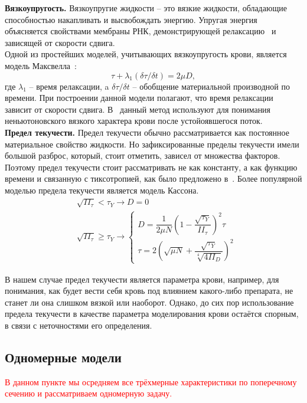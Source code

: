 \textbf{Вязкоупругость.}
Вязкоупругие жидкости -- это вязкие жидкости, обладающие способностью накапливать и высвобождать энергию. 
Упругая энергия объясняется свойствами мембраны РНК, демонстрирующей релаксацию~\cite{evans:1976} и зависящей от скорости сдвига.\\
Одной из простейших моделей, учитывающих вязкоупругость крови, является модель Максвелла~\cite{thurston:1972}:
$$
\tau+\lambda_1(\delta\tau / \delta t)=2\mu D,
$$  
где $\lambda_1$ -- время релаксации, a $\delta\tau / \delta t$ -- обобщение материальной производной по времени.
При построении данной модели полагают, что время релаксации зависит от скорости сдвига.
В~\cite{thurston:1994} данный метод используют для понимания неньютоновского вязкого характера крови после устойоявшегося поток.\\

\textbf{Предел текучести.}
Предел текучести обычно рассматривается как постоянное материальное свойство жидкости. 
Но зафиксированные пределы текучести имели большой разброс, который, стоит отметить, зависел от множества факторов.
Поэтому предел текучести стоит рассматривать не как константу, а как функцию времени и связанную с тиксотропией, 
как было предложено в~\cite{moller:2006}.
Более популярной моделью предела текучести является модель Кассона.
$$
\begin{aligned}
	&\sqrt{II_\tau} < \tau_Y\longrightarrow D=0 \\
	&\sqrt{II_\tau} \geq \tau_Y\longrightarrow
	\begin{cases}
		D   = \dfrac{1}{2\mu N}\left(1-\dfrac{\sqrt{\tau_Y}}{II_\tau}\right)^2\tau \\[10pt]
		\tau= 2\left(\sqrt{\mu N}+\dfrac{\sqrt{\tau_Y}}{\sqrt[4]{4II_D}}\right)^2
	\end{cases}
\end{aligned}
$$

В нашем случае предел текучести является параметра крови, например, для понимания, как будет вести себя кровь под влиянием какого-либо 
препарата, не станет ли она слишком вязкой или наоборот.
Однако, до сих пор использование предела текучести в качестве параметра моделирования крови остаётся спорным, 
в связи с неточностями его определения.

\subsection{Одномерные модели}

\textcolor{red}{В данном пункте мы осредняем все трёхмерные характеристики
по поперечному сечению и рассматриваем одномерную задачу.}

